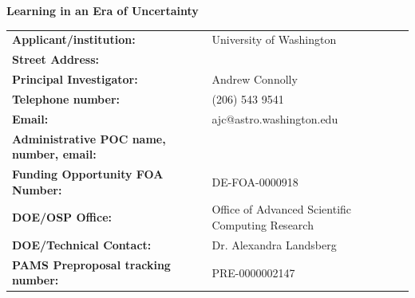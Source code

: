 \documentclass[useAMS,usenatbib,tightenlines,11pt,preprint]{aastex}
\begin{document}
 

\begin{center}
{\bf \Large Learning in an Era of Uncertainty}
\end{center}

\vspace{1cm}

\noindent
\begin{tabular}{ll}
{\bf Applicant/institution: } & University of Washington\\
{\bf Street Address: } & \\
{\bf Principal Investigator: } &Andrew Connolly \\
{\bf Telephone number: } & (206) 543 9541 \\
{\bf Email: } & ajc@astro.washington.edu \\
{\bf Administrative POC name, number, email:} & \\
{\bf Funding Opportunity FOA Number:} & DE-FOA-0000918 \\
{\bf DOE/OSP Office: } & Office of Advanced Scientific Computing Research \\
{\bf DOE/Technical Contact: } & Dr. Alexandra Landsberg \\
{\bf PAMS Preproposal tracking number: } & PRE-0000002147 \\
\end{tabular}

\end{document}
